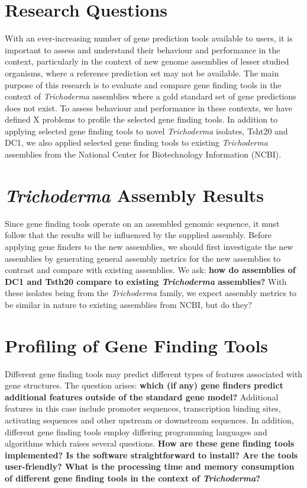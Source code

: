 \section{Research Questions}

With an ever-increasing number of gene prediction tools available to
users, it is important to assess and understand their behaviour and
performance in the context, particularly in the context of new genome
assemblies of lesser studied organisms, where a reference prediction
set may not be available. The main purpose of this research is to
evaluate and compare gene finding tools in the context of
\textit{Trichoderma} assemblies where a gold standard set of gene
predictions does not exist. To assess behaviour and performance in
these contexts, we have defined X problems to profile the selected
gene finding tools. In addition to applying selected gene finding
tools to novel \textit{Trichoderma} isolates, Tsht20 and DC1, we also
applied selected gene finding tools to existing \textit{Trichoderma}
assemblies from the National Center for Biotechnology Information
(NCBI).

\section{\textit{Trichoderma} Assembly Results}
\label{rq:assembly-results}

Since gene finding tools operate on an assembled genomic sequence, it
must follow that the results will be influenced by the supplied
assembly. Before applying gene finders to the new assemblies, we
should first investigate the new assemblies by generating general
assembly metrics for the new assemblies to contrast and compare with
existing assemblies. We ask: \textbf{how do assemblies of DC1 and
  Tsth20 compare to existing \textit{Trichoderma} assemblies?} With
these isolates being from the \textit{Trichoderma} family, we expect
assembly metrics to be similar in nature to existing assemblies from
NCBI, but do they?

\section{Profiling of Gene Finding Tools}

Different gene finding tools may predict different types of features
associated with gene structures. The question arises: \textbf{which
  (if any) gene finders predict additional features outside of the
  standard gene model?} Additional features in this case include
promoter sequences, transcription binding sites, activating sequences
and other upstream or downstream sequences. In addition, different
gene finding tools employ differing programming languages and
algorithms which raises several questions. \textbf{How are these gene
  finding tools implemented? Is the software straightforward to
  install? Are the tools user-friendly? What is the processing time
  and memory consumption of different gene finding tools in the
  context of \textit{Trichoderma}?}

